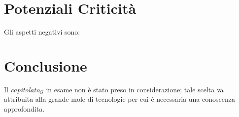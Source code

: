 \section{Potenziali Criticità}
Gli aspetti negativi sono:
\section{Conclusione}
Il \textit{capitolato$_{G}$} in esame non è stato preso in considerazione; tale scelta va attribuita alla grande mole di tecnologie per cui è necessaria una conoscenza approfondita.